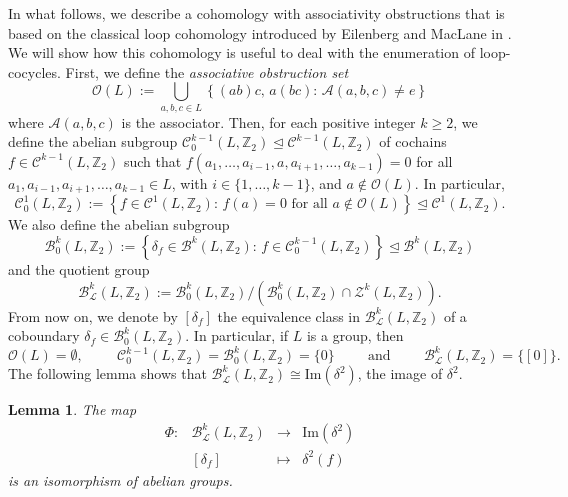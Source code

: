 \documentclass[11pt,a4paper]{article}
\newtheorem{lemma}[theorem]{Lemma}
\begin{document}
In what follows, we describe a cohomology with associativity obstructions that is based on the classical loop cohomology introduced by Eilenberg and MacLane in \citep{Eilenberg1947}. We will show how this cohomology is useful to deal with the enumeration of loop-cocycles. First, we define the {\em associative obstruction set}
\[\mathcal{O}(L):=\bigcup_{a,b,c\in L}\left\{(ab)c,\, a(bc)\colon\, \mathcal{A}(a,b,c)\neq e\right\}\]
where $\mathcal{A}(a,b,c)$ is the associator. Then, for each positive integer $k\geq 2$, we define the abelian subgroup $\mathcal{C}_0^{k-1}(L,\mathbb{Z}_2)\trianglelefteq \mathcal{C}^{k-1}(L,\mathbb{Z}_2)$ of cochains $f\in \mathcal{C}^{k-1}(L,\mathbb{Z}_2)$ such that $f(a_1,\ldots,a_{i-1},a,a_{i+1},\ldots,a_{k-1})=0$ for all $a_1,a_{i-1},a_{i+1},\ldots,a_{k-1}\in L$, with $i\in\{1,\ldots,k-1\}$, and $a\not\in\mathcal{O}(L)$. In particular,
\[\mathcal{C}_0^1(L,\mathbb{Z}_2):=\left\{f\in \mathcal{C}^1(L,\mathbb{Z}_2)\colon\, f(a)=0 \text{ for all } a\not\in\mathcal{O}(L)\right\}\trianglelefteq \mathcal{C}^1(L,\mathbb{Z}_2).\]
We also define the abelian subgroup
\[\mathcal{B}_0^k(L,\mathbb{Z}_2):=\left\{\delta_f\in \mathcal{B}^k(L,\mathbb{Z}_2)\colon\, f\in \mathcal{C}^{k-1}_0(L,\mathbb{Z}_2)\right\}\trianglelefteq \mathcal{B}^k(L,\mathbb{Z}_2)\]
and the quotient group
\[\mathcal{B}_\mathcal{L}^k(L,\mathbb{Z}_2):=\mathcal{B}_0^k(L,\mathbb{Z}_2)/\left(\mathcal{B}_0^k(L,\mathbb{Z}_2)\cap \mathcal{Z}^k(L,\mathbb{Z}_2)\right).\]
From now on, we denote by $[\delta_f]$ the equivalence class in $\mathcal{B}_\mathcal{L}^k(L,\mathbb{Z}_2)$ of a coboundary $\delta_f\in \mathcal{B}_0^k(L,\mathbb{Z}_2)$. In particular, if $L$ is a group, then
\[\mathcal{O}(L)=\emptyset,\hspace{1cm} \mathcal{C}_0^{k-1}(L,\mathbb{Z}_2)=\mathcal{B}_0^k(L,\mathbb{Z}_2)=\{0\}\hspace{1cm}\text{and}\hspace{1cm} \mathcal{B}_\mathcal{L}^k(L,\mathbb{Z}_2)=\{[0]\}.\]
The following lemma shows that $\mathcal{B}_\mathcal{L}^k(L,\mathbb{Z}_2)\cong \mathrm{Im}(\delta^2)$, the image of $\delta^2$.

\begin{lemma}\label{lemma_quotient}
The map
\[\begin{array}{cccc}
\Phi: & \mathcal{B}_{\mathcal{L}}^k(L,\mathbb{Z}_2)& \to & \mathrm{Im}(\delta^2)\\
& [\delta_f] &\mapsto & \delta^2(f)
\end{array}\]
is an isomorphism of abelian groups.
\end{lemma}
\end{document}
